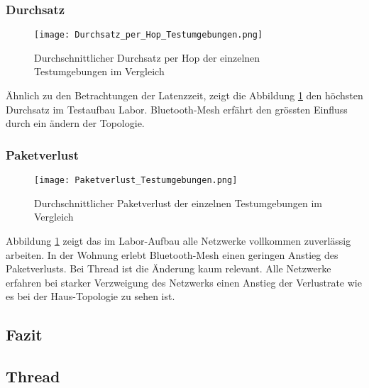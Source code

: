 \subsubsection{Durchsatz}\label{subsec:VergleichDurchsatzTestumgebungen}


\begin{figure}[H]
	\centering
	\texttt{[image: Durchsatz\_per\_Hop\_Testumgebungen.png]}
	\caption{Durchschnittlicher Durchsatz per Hop der einzelnen Testumgebungen im Vergleich}\label{fig:Durchsätze_per_Hop_Testumgebungen}
\end{figure}

Ähnlich zu den Betrachtungen der Latenzzeit, zeigt die Abbildung \ref{fig:Durchsätze_per_Hop_Testumgebungen} den höchsten Durchsatz im Testaufbau Labor. Bluetooth-Mesh erfährt den grössten Einfluss durch ein ändern der Topologie. 

\subsubsection{Paketverlust}\label{subsec:VergleichPaketverlustTestumgebungen}


\begin{figure}[H]
	\centering
	\texttt{[image: Paketverlust\_Testumgebungen.png]}
	\caption{Durchschnittlicher Paketverlust der einzelnen Testumgebungen im Vergleich}\label{fig:PaketverlusteTestumgebungen}
\end{figure}

Abbildung \ref{fig:Durchsätze_per_Hop_Testumgebungen} zeigt das im Labor-Aufbau alle Netzwerke vollkommen zuverlässig arbeiten. In der Wohnung erlebt Bluetooth-Mesh einen geringen Anstieg des Paketverlusts. Bei Thread ist die Änderung kaum relevant. Alle Netzwerke erfahren bei starker Verzweigung des Netzwerks einen Anstieg der Verlustrate wie es bei der Haus-Topologie zu sehen ist. 


\subsection{Fazit}\label{subsec:Fazit}


\subsection{Thread}\label{subsec:Thread}

